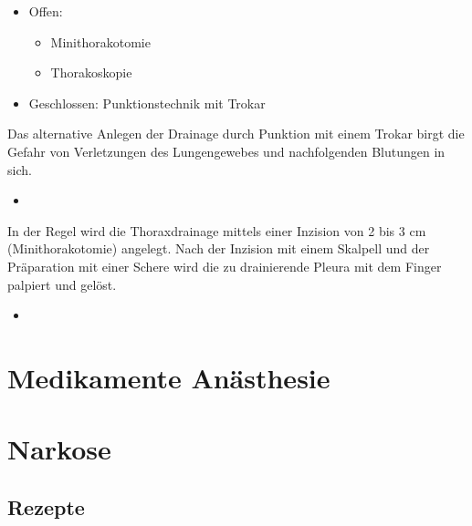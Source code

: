 {%
%

\cite{wiki:thoraxdrainge-20150127}
}
{%
\begin{itemize}
  \item Offen:
  \begin{itemize}
    \item Minithorakotomie
    \item Thorakoskopie
  \end{itemize}
  \item Geschlossen: Punktionstechnik mit Trokar
\end{itemize}
}

{%
Das alternative Anlegen der Drainage durch Punktion mit 
einem Trokar birgt die Gefahr von Verletzungen des Lungengewebes und 
nachfolgenden Blutungen in sich.
}
{%
\begin{itemize}
  \item
\end{itemize}
}

{%
In der Regel wird die Thoraxdrainage mittels einer Inzision von 2 bis 3 cm 
(Minithorakotomie) angelegt. Nach der Inzision mit einem Skalpell und der 
Präparation mit einer Schere wird die zu drainierende Pleura mit dem Finger 
palpiert und gelöst. 
}
{%
\begin{itemize}
  \item
\end{itemize}
}

\section{Medikamente Anästhesie}


\section{Narkose}

\subsection{Rezepte}

